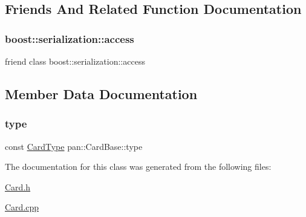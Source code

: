 \subsection{Friends And Related Function Documentation}
\mbox{\label{classpan_1_1_card_base_ac98d07dd8f7b70e16ccb9a01abf56b9c}} 
\subsubsection{\texorpdfstring{boost\+::serialization\+::access}{boost::serialization::access}}
{\footnotesize\ttfamily friend class boost\+::serialization\+::access\hspace{0.3cm}{\ttfamily [friend]}}



\subsection{Member Data Documentation}
\mbox{\label{classpan_1_1_card_base_a47c25b9584c70305e862fcab7d0212ee}} 
\subsubsection{\texorpdfstring{type}{type}}
{\footnotesize\ttfamily const \hyperlink{namespacepan_a1f7350bfd0421afeabe9fa95c16fa811}{Card\+Type} pan\+::\+Card\+Base\+::type}



The documentation for this class was generated from the following files\+:\begin{DoxyCompactItemize}
\item 
\hyperlink{_card_8h}{Card.\+h}\item 
\hyperlink{_card_8cpp}{Card.\+cpp}\end{DoxyCompactItemize}
